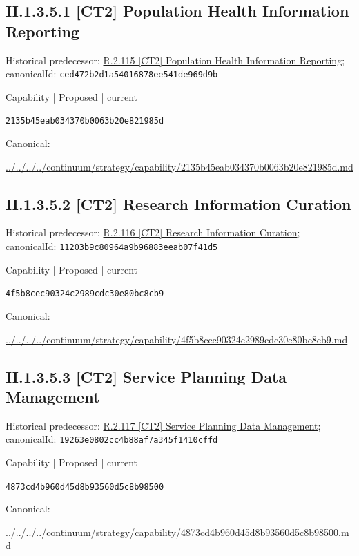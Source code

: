\documentclass[10pt,a4paper]{article}
\begin{document}
\subsection*{II.1.3.5.1 [CT2] Population Health Information Reporting}
Historical predecessor: \hyperref[element-ced472b2d1a54016878ee541de969d9b]{R.2.115 [CT2] Population Health Information Reporting}; canonicalId: \texttt{ced472b2d1a54016878ee541de969d9b}\par
\label{element-2135b45eab034370b0063b20e821985d}
{\small Capability | Proposed | current}\par
\texttt{2135b45eab034370b0063b20e821985d}\par
Canonical: \par
{\footnotesize\url{../../../../continuum/strategy/capability/2135b45eab034370b0063b20e821985d.md}}\par
\subsection*{II.1.3.5.2 [CT2] Research Information Curation}
Historical predecessor: \hyperref[element-11203b9c80964a9b96883eeab07f41d5]{R.2.116 [CT2] Research Information Curation}; canonicalId: \texttt{11203b9c80964a9b96883eeab07f41d5}\par
\label{element-4f5b8cec90324c2989cdc30e80bc8cb9}
{\small Capability | Proposed | current}\par
\texttt{4f5b8cec90324c2989cdc30e80bc8cb9}\par
Canonical: \par
{\footnotesize\url{../../../../continuum/strategy/capability/4f5b8cec90324c2989cdc30e80bc8cb9.md}}\par
\subsection*{II.1.3.5.3 [CT2] Service Planning Data Management}
Historical predecessor: \hyperref[element-19263e0802cc4b88af7a345f1410cffd]{R.2.117 [CT2] Service Planning Data Management}; canonicalId: \texttt{19263e0802cc4b88af7a345f1410cffd}\par
\label{element-4873cd4b960d45d8b93560d5c8b98500}
{\small Capability | Proposed | current}\par
\texttt{4873cd4b960d45d8b93560d5c8b98500}\par
Canonical: \par
{\footnotesize\url{../../../../continuum/strategy/capability/4873cd4b960d45d8b93560d5c8b98500.md}}\par
\end{document}
